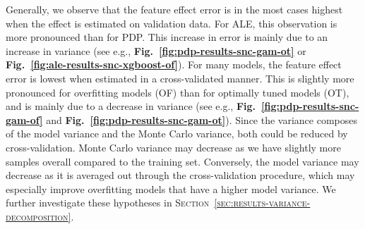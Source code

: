 \documentclass[runningheads]{llncs}
\begin{document}
Generally, we observe that the feature effect error is in the most cases
highest when the effect is estimated on validation data. For ALE, this
observation is more pronounced than for PDP. This increase in error is mainly  %
due to an increase in variance (see e.g.,
\textbf{Fig.\@~\ref{fig:pdp-results-snc-gam-ot}} or
\textbf{Fig.\@~\ref{fig:ale-results-snc-xgboost-of}}). For many models, the
feature effect error is lowest when estimated in a cross-validated manner. This
is slightly more pronounced for overfitting models (OF) than for optimally
tuned models (OT), and is mainly due to a decrease in variance (see e.g.,
\textbf{Fig.\@~\ref{fig:pdp-results-snc-gam-of}} and
\textbf{Fig.\@~\ref{fig:pdp-results-snc-gam-ot}}). Since the variance composes
of the model variance and the Monte Carlo variance, both could be reduced by
cross-validation. Monte Carlo variance may decrease as we have slightly more
samples overall compared to the training set. Conversely, the model variance
may decrease as it is averaged out through the cross-validation procedure,
which may especially improve overfitting models that have a higher model
variance. We further investigate these hypotheses in
\textsc{Section~\ref{sec:results-variance-decomposition}}.
\end{document}
